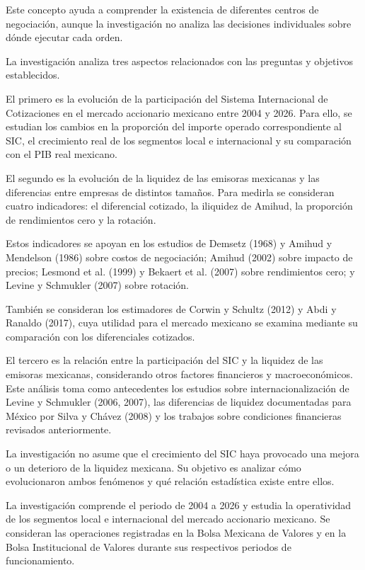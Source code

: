 Este concepto ayuda a comprender la existencia de diferentes centros de negociación, aunque la investigación no analiza las decisiones individuales sobre dónde ejecutar cada orden.


La investigación analiza tres aspectos relacionados con las preguntas y objetivos establecidos.

El primero es la evolución de la participación del Sistema Internacional de Cotizaciones en el mercado accionario mexicano entre 2004 y 2026. Para ello, se estudian los cambios en la proporción del importe operado correspondiente al SIC, el crecimiento real de los segmentos local e internacional y su comparación con el PIB real mexicano.

El segundo es la evolución de la liquidez de las emisoras mexicanas y las diferencias entre empresas de distintos tamaños. Para medirla se consideran cuatro indicadores: el diferencial cotizado, la iliquidez de Amihud, la proporción de rendimientos cero y la rotación.

Estos indicadores se apoyan en los estudios de Demsetz (1968) y Amihud y Mendelson (1986) sobre costos de negociación; Amihud (2002) sobre impacto de precios; Lesmond et al. (1999) y Bekaert et al. (2007) sobre rendimientos cero; y Levine y Schmukler (2007) sobre rotación.

También se consideran los estimadores de Corwin y Schultz (2012) y Abdi y Ranaldo (2017), cuya utilidad para el mercado mexicano se examina mediante su comparación con los diferenciales cotizados.

El tercero es la relación entre la participación del SIC y la liquidez de las emisoras mexicanas, considerando otros factores financieros y macroeconómicos. Este análisis toma como antecedentes los estudios sobre internacionalización de Levine y Schmukler (2006, 2007), las diferencias de liquidez documentadas para México por Silva y Chávez (2008) y los trabajos sobre condiciones financieras revisados anteriormente.

La investigación no asume que el crecimiento del SIC haya provocado una mejora o un deterioro de la liquidez mexicana. Su objetivo es analizar cómo evolucionaron ambos fenómenos y qué relación estadística existe entre ellos.


La investigación comprende el periodo de 2004 a 2026 y estudia la operatividad de los segmentos local e internacional del mercado accionario mexicano. Se consideran las operaciones registradas en la Bolsa Mexicana de Valores y en la Bolsa Institucional de Valores durante sus respectivos periodos de funcionamiento.

